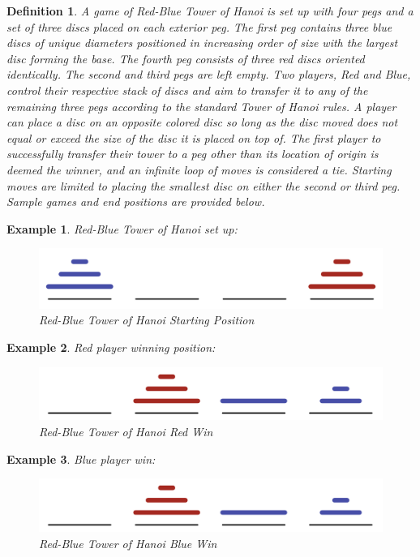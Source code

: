 \documentclass[12pt,reqno]{amsart}
\theoremstyle{plain}
\newtheorem{definition}{Definition}
\newtheorem{example}{Example}
\begin{document}
\begin{definition}
A game of Red-Blue Tower of Hanoi is set up with four pegs and a set of three discs placed on each exterior peg. The first peg contains three blue discs of unique diameters positioned in increasing order of size with the largest disc forming the base. The fourth peg consists of three red discs oriented identically. The second and third pegs are left empty. Two players, Red and Blue, control their respective stack of discs and aim to transfer it to any of the remaining three pegs according to the standard Tower of Hanoi rules. A player can place a disc on an opposite colored disc so long as the disc moved does not equal or exceed the size of the disc it is placed on top of. The first player to successfully transfer their tower to a peg other than its location of origin is deemed the winner, and an infinite loop of moves is considered a tie. Starting moves are limited to placing the smallest disc on either the second or third peg. Sample games and end positions are provided below.
\end{definition}
\begin{example}
Red-Blue Tower of Hanoi set up:
\begin{figure}[htp]
    \centering
    \includegraphics[width=13cm]{modern1.jpg}
    \caption{Red-Blue Tower of Hanoi Starting Position}
    \label{fig:Starting position}
\end{figure}
\end{example}
\begin{example}
Red player winning position:
\begin{figure}[htp]
    \centering
    \includegraphics[width=13cm]{modern2.jpg}
    \caption{Red-Blue Tower of Hanoi Red Win}
    \label{fig:Red Win} 
\end{figure}
\end{example}
\break
\begin{example} 


Blue player win:
\begin{figure}[htp]
    \centering
    \includegraphics[width=13cm]{modern2.jpg}
    \caption{Red-Blue Tower of Hanoi Blue Win}
    \label{fig:Blue Win}
\end{figure}
\end{example} 
\end{document}
